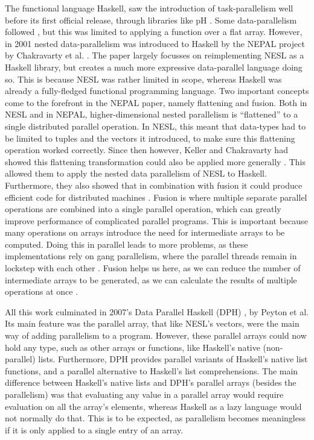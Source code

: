         The functional language Haskell, saw the introduction of task-parallelism well before its first official release, through libraries like pH \cite{maessen1995semantics}.
        Some data-parallelism followed \cite{hill1995data, herrmann1999parallelization, ellmenreich2000application}, but this was limited to applying a function over a flat array.
        However, in 2001 nested data-parallelism was introduced to Haskell by the NEPAL project by Chakravarty et al. \cite{chakravarty2001nepal}.
        The paper largely focusses on reimplementing NESL as a Haskell library, but creates a much more expressive data-parallel language doing so.
        This is because NESL was rather limited in scope, whereas Haskell was already a fully-fledged functional programming language.
        Two important concepts come to the forefront in the NEPAL paper, namely flattening and fusion.
        Both in NESL and in NEPAL, higher-dimensional nested parallelism is ``flattened'' to a single distributed parallel operation.
        In NESL, this meant that data-types had to be limited to tuples and the vectors it introduced, to make sure this flattening operation worked correctly.
        Since then however, Keller and Chakravarty had showed this flattening transformation could also be applied more generally \cite{keller1999transformation,keller1998flattening,chakravarty2000more}.
        This allowed them to apply the nested data parallelism of NESL to Haskell.
        Furthermore, they also showed that in combination with fusion it could produce efficient code for distributed machines \cite{chakravarty2001functional}.
        Fusion is where multiple separate parallel operations are combined into a single parallel operation, which can greatly improve performance of complicated parallel programs.
        This is important because many operations on arrays introduce the need for intermediate arrays to be computed.
        Doing this in parallel leads to more problems, as these implementations rely on gang parallelism, where the parallel threads remain in lockstep with each other \cite{feitelson1996packing}.
        Fusion helps us here, as we can reduce the number of intermediate arrays to be generated, as we can calculate the results of multiple operations at once \cite{keller1999distributed,chakravarty2007data}.
        
        All this work culminated in 2007's Data Parallel Haskell (DPH) \cite{peyton2008harnessing}, by Peyton et al.
        Its main feature was the parallel array, that like NESL's vectors, were the main way of adding parallelism to a program.
        However, these parallel arrays could now hold any type, such as other arrays or functions, like Haskell's native (non-parallel) lists.
        Furthermore, DPH provides parallel variants of Haskell's native list functions, and a parallel alternative to Haskell's list comprehensions.
        The main difference between Haskell's native lists and DPH's parallel arrays (besides the parallelism) was that evaluating any value in a parallel array would require evaluation on all the array's elements, whereas Haskell as a lazy language would not normally do that.
        This is to be expected, as parallelism becomes meaningless if it is only applied to a single entry of an array.

